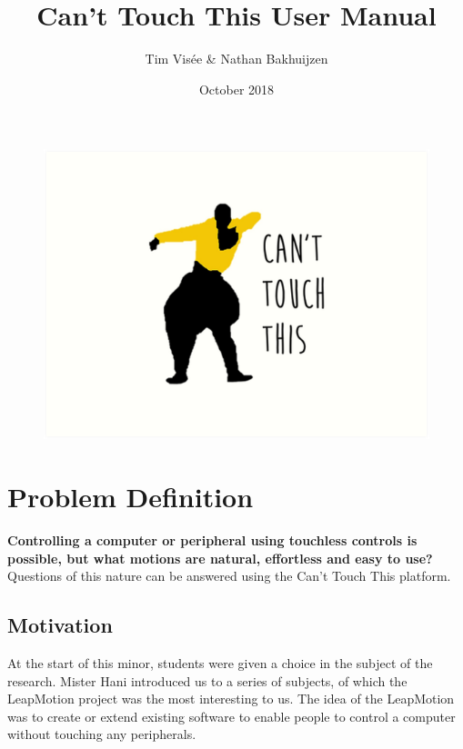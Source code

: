 \documentclass[a4paper]{article}
\title{Can't Touch This User Manual}
\author{Tim Visée \& Nathan Bakhuijzen}
\date{October 2018}
\begin{document}
  \maketitle
  \begin{figure}[h]
    \centering
    \includegraphics[width=\linewidth]{cant-touch-this}
  \end{figure}
  \clearpage


  \section{Problem Definition}
  \textbf{Controlling a computer or peripheral using touchless controls is
    possible, but what motions are natural, effortless and easy to use?}
  Questions of this nature can be answered using the Can't Touch This platform.

  \subsection{Motivation}
  At the start of this minor, students were given a choice in the subject of the
  research. Mister Hani introduced us to a series of subjects, of which the
  LeapMotion project was the most interesting to us. The idea of the LeapMotion
  was to create or extend existing software to enable people to control a
  computer without touching any peripherals.
\end{document}
